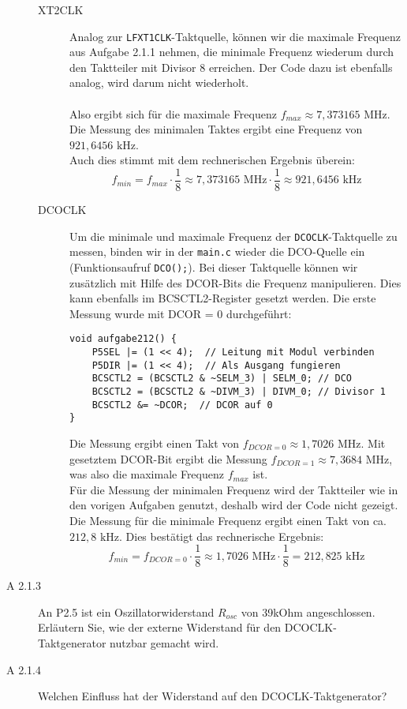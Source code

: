 \documentclass[11pt,a4paper,ngerman]{article}
\begin{document}
\begin{description}
\begin{description}
			\item[XT2CLK] Analog zur \texttt{LFXT1CLK}-Taktquelle, können wir die maximale Frequenz aus Aufgabe 2.1.1 nehmen, die minimale Frequenz wiederum durch den Taktteiler mit Divisor 8 erreichen. Der Code dazu ist ebenfalls analog, wird darum nicht wiederholt. \\ \\
			Also ergibt sich für die maximale Frequenz $f_{max} \approx 7,373165 \text{ MHz}$. \\
			Die Messung des minimalen Taktes ergibt eine Frequenz von $921,6456 \text{ kHz}$. \\
			Auch dies stimmt mit dem rechnerischen Ergebnis überein:
			$$ f_{min} = f_{max} \cdot \frac{1}{8} \approx 7,373165 \text{ MHz} \cdot \frac{1}{8} \approx 921,6456 \text{ kHz}$$
			\item[DCOCLK] Um die minimale und maximale Frequenz der \texttt{DCOCLK}-Taktquelle zu messen, binden wir in der \texttt{main.c} wieder die DCO-Quelle ein (Funktionsaufruf \texttt{DCO();}). Bei dieser Taktquelle können wir zusätzlich mit Hilfe des DCOR-Bits die Frequenz manipulieren. Dies kann ebenfalls im BCSCTL2-Register gesetzt werden. Die erste Messung wurde mit DCOR = 0 durchgeführt:
			\begin{lstlisting}
void aufgabe212() {
    P5SEL |= (1 << 4);	// Leitung mit Modul verbinden
    P5DIR |= (1 << 4);	// Als Ausgang fungieren
    BCSCTL2 = (BCSCTL2 & ~SELM_3) | SELM_0; // DCO
    BCSCTL2 = (BCSCTL2 & ~DIVM_3) | DIVM_0; // Divisor 1
    BCSCTL2 &= ~DCOR;  // DCOR auf 0
}
\end{lstlisting}
			Die Messung ergibt einen Takt von $ f_{DCOR = 0} \approx 1,7026 \text{ MHz} $.
			Mit gesetztem DCOR-Bit ergibt die Messung $ f_{DCOR = 1} \approx 7,3684 \text{ MHz} $, was also die maximale Frequenz $f_{max}$ ist. \\
			Für die Messung der minimalen Frequenz wird der Taktteiler wie in den vorigen Aufgaben genutzt, deshalb wird der Code nicht gezeigt. Die Messung für die minimale Frequenz ergibt einen Takt von ca. $212,8 \text{ kHz}$. Dies bestätigt das rechnerische Ergebnis:
			$$ f_{min} = f_{DCOR = 0} \cdot \frac{1}{8} \approx 1,7026 \text{ MHz} \cdot \frac{1}{8} = 212,825 \text{ kHz} $$
		\end{description}
		
	\item[A 2.1.3] An P2.5 ist ein Oszillatorwiderstand $R_{osc}$ von 39kOhm angeschlossen. Erläutern Sie, wie der externe Widerstand für den DCOCLK-Taktgenerator nutzbar gemacht wird.  
		
		
	\item[A 2.1.4] Welchen Einfluss hat der Widerstand auf den DCOCLK-Taktgenerator?  \\
	

\end{description}
\end{document}
